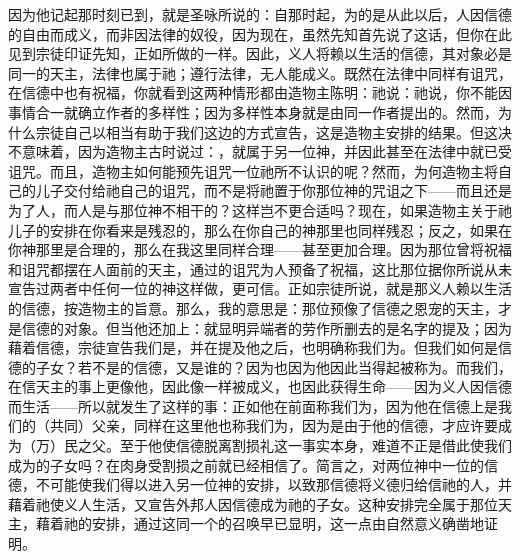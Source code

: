 因为他记起那时刻已到，就是圣咏所说的：自那时起，为的是从此以后，人因信德的自由而成义，而非因法律的奴役，因为现在，虽然先知首先说了这话，但你在此见到宗徒印证先知，正如所做的一样。因此，义人将赖以生活的信德，其对象必是同一的天主，法律也属于祂；遵行法律，无人能成义。既然在法律中同样有诅咒，在信德中也有祝福，你就看到这两种情形都由造物主陈明：祂说：祂说，你不能因事情合一就确立作者的多样性；因为多样性本身就是由同一作者提出的。然而，为什么宗徒自己以相当有助于我们这边的方式宣告，这是造物主安排的结果。但这决不意味着，因为造物主古时说过：，就属于另一位神，并因此甚至在法律中就已受诅咒。而且，造物主如何能预先诅咒一位祂所不认识的呢？然而，为何造物主将自己的儿子交付给祂自己的诅咒，而不是将祂置于你那位神的咒诅之下——而且还是为了人，而人是与那位神不相干的？这样岂不更合适吗？现在，如果造物主关于祂儿子的安排在你看来是残忍的，那么在你自己的神那里也同样残忍；反之，如果在你神那里是合理的，那么在我这里同样合理——甚至更加合理。因为那位曾将祝福和诅咒都摆在人面前的天主，通过的诅咒为人预备了祝福，这比那位据你所说从未宣告过两者中任何一位的神这样做，更可信。正如宗徒所说，就是那义人赖以生活的信德，按造物主的旨意。那么，我的意思是：那位预像了信德之恩宠的天主，才是信德的对象。但当他还加上：就显明异端者的劳作所删去的是名字的提及；因为藉着信德，宗徒宣告我们是，并在提及他之后，也明确称我们为。但我们如何是信德的子女？若不是的信德，又是谁的？因为也因为他因此当得起被称为。而我们，在信天主的事上更像他，因此像一样被成义，也因此获得生命——因为义人因信德而生活——所以就发生了这样的事：正如他在前面称我们为，因为他在信德上是我们的（共同）父亲，同样在这里他也称我们为，因为是由于他的信德，才应许要成为（万）民之父。至于他使信德脱离割损礼这一事实本身，难道不正是借此使我们成为的子女吗？在肉身受割损之前就已经相信了。简言之，对两位神中一位的信德，不可能使我们得以进入另一位神的安排，以致那信德将义德归给信祂的人，并藉着祂使义人生活，又宣告外邦人因信德成为祂的子女。这种安排完全属于那位天主，藉着祂的安排，通过这同一个的召唤早已显明，这一点由自然意义确凿地证明。\par

